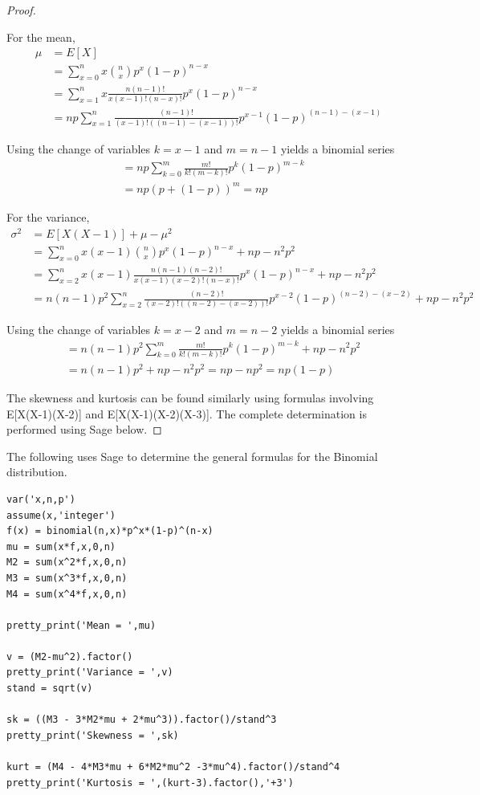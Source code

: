 \documentclass[10pt,]{book}
\theoremstyle{plain}
\theoremstyle{definition}
\theoremstyle{definition}
\theoremstyle{definition}
\numberwithin{equation}{section}
\begin{document}
\begin{proof}\hypertarget{proof-36}{}
For the mean,
		\begin{align*}
 \mu & = E[X] \\
 & = \sum_{x=0}^{n} {x \binom{n}{x} p^x (1-p)^{n-x}}\\
 & = \sum_{x=1}^{n} {x \frac{n(n-1)!}{x(x-1)!(n-x)!} p^x (1-p)^{n-x}}\\
 & = np \sum_{x=1}^{n} {\frac{(n-1)!}{(x-1)!((n-1)-(x-1))!} p^{x-1} (1-p)^{(n-1)-(x-1)}}
\end{align*}

		Using the change of variables \(k=x-1\) and \(m = n-1\) yields a binomial series
		\begin{align*}
 & = np \sum_{k=0}^{m} {\frac{m!}{k!(m-k)!} p^k (1-p)^{m-k}}\\
 & = np (p + (1-p))^m = np
\end{align*}
\par
For the variance,
		\begin{align*}
 \sigma^2 & = E[X(X-1)] + \mu - \mu^2 \\
 & = \sum_{x=0}^{n} {x(x-1) \binom{n}{x} p^x (1-p)^{n-x}} + np - n^2p^2\\
 & = \sum_{x=2}^{n} {x(x-1) \frac{n(n-1)(n-2)!}{x(x-1)(x-2)!(n-x)!} p^x (1-p)^{n-x}}  + np - n^2p^2\\
 & = n(n-1)p^2 \sum_{x=2}^{n} {\frac{(n-2)!}{(x-2)!((n-2)-(x-2))!} p^{x-2} (1-p)^{(n-2)-(x-2)}} + np - n^2p^2
\end{align*}
\par
Using the change of variables \(k=x-2\) and \(m = n-2\) yields a binomial series
	\begin{align*}
 & = n(n-1)p^2  \sum_{k=0}^{m} {\frac{m!}{k!(m-k)!} p^k (1-p)^{m-k}} + np - n^2p^2\\
 & = n(n-1)p^2 + np - n^2p^2 = np - np^2 = np(1-p)
\end{align*}
\par
The skewness and kurtosis can be found similarly using formulas involving E[X(X-1)(X-2)] and E[X(X-1)(X-2)(X-3)]. The complete determination is performed using Sage below.
\end{proof}
\par
The following uses Sage to determine the general formulas for the Binomial distribution.
%
\begin{lstlisting}[style=sageinput]
var('x,n,p')
assume(x,'integer')
f(x) = binomial(n,x)*p^x*(1-p)^(n-x)
mu = sum(x*f,x,0,n)
M2 = sum(x^2*f,x,0,n)
M3 = sum(x^3*f,x,0,n)
M4 = sum(x^4*f,x,0,n)

pretty_print('Mean = ',mu)

v = (M2-mu^2).factor()
pretty_print('Variance = ',v)
stand = sqrt(v)

sk = ((M3 - 3*M2*mu + 2*mu^3)).factor()/stand^3
pretty_print('Skewness = ',sk)

kurt = (M4 - 4*M3*mu + 6*M2*mu^2 -3*mu^4).factor()/stand^4
pretty_print('Kurtosis = ',(kurt-3).factor(),'+3')
\end{lstlisting}
\end{document}
